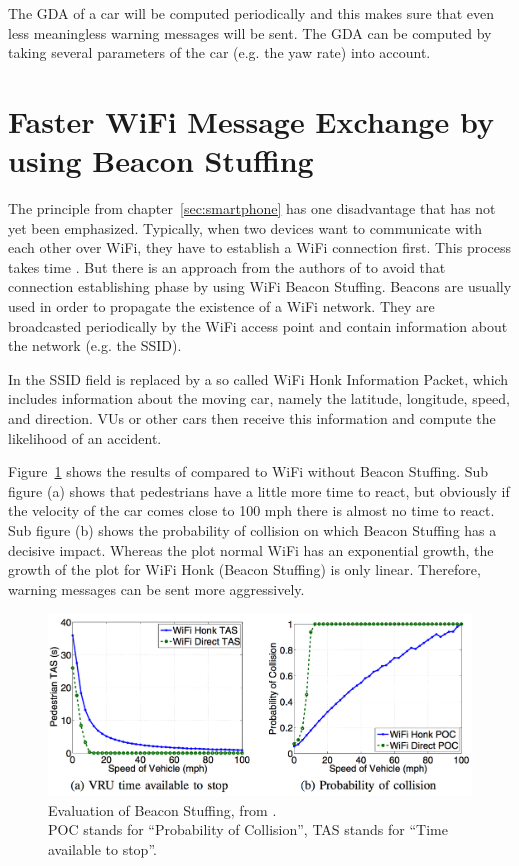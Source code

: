 \documentclass[]{ccs-thesis}
\begin{document}
The \ac{GDA} of a car will be computed periodically and this makes sure that even less meaningless warning messages will be sent. The \ac{GDA} can be computed by taking several parameters of the car (e.g. the yaw rate) into account.


\section{Faster WiFi Message Exchange by using Beacon Stuffing}\label{sec:beacon}

The principle from chapter~\ref{sec:smartphone} has one disadvantage that has not yet been emphasized.
Typically, when two devices want to communicate with each other over WiFi, they have to establish a WiFi connection first. This process takes time . But there is an approach from the authors of \cite{beacon} to avoid that connection establishing phase by using WiFi Beacon Stuffing. Beacons are usually used in order to propagate the existence of a WiFi network. They are broadcasted periodically by the WiFi access point and contain information about the network (e.g. the SSID).

In \cite{beacon} the SSID field is replaced by a so called WiFi Honk Information Packet, which includes information about the moving car, namely the latitude, longitude, speed, and direction. \acp{VU} or other cars then receive this information and compute the likelihood of an accident.

Figure~\ref{fig:beacon} shows the results of \cite{beacon} compared to WiFi without Beacon Stuffing. Sub figure (a) shows that pedestrians have a little more time to react, but obviously if the velocity of the car comes close to 100 mph there is almost no time to react. Sub figure (b) shows the probability of collision on which Beacon Stuffing has a decisive impact. Whereas the plot normal WiFi has an exponential growth, the growth of the plot for WiFi Honk (Beacon Stuffing) is only linear. Therefore, warning messages can be sent more aggressively. 

\begin{figure}[h]
	\centering
	\includegraphics[width=1\textwidth]{figures/6_beacon}
	\caption{Evaluation of Beacon Stuffing, from \cite{beacon}. \\POC stands for \enquote{Probability of Collision}, TAS stands for \enquote{Time available to stop}.}%
	\label{fig:beacon}%
\end{figure}
\end{document}
